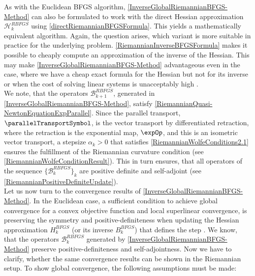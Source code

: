 As with the Euclidean BFGS algorithm, \cref{InverseGlobalRiemannianBFGS-Method} can also be formulated to work with the direct Hessian approximation $\mathcal{H}^{RBFGS}_k$ using \cref{directRiemannianBFGSFormula}. This yields a mathematically equivalent algorithm. Again, the question arises, which variant is more suitable in practice for the underlying problem. \cref{RiemannianInverseBFGSFormula} makes it possible to cheaply compute an approximation of the inverse of the Hessian. This may make \cref{InverseGlobalRiemannianBFGS-Method} advantageous even in the case, where we have a cheap exact formula for the Hessian but not for its inverse or when the cost of solving linear systems is unacceptably high \cite[p.~13]{Qi:2011}. \\
We note, that the operators $\mathcal{B}^{RBFGS}_{k+1}$, generated in \cref{InverseGlobalRiemannianBFGS-Method}, satisfy \cref{RiemannianQuasi-NewtonEquationExpParallel}. Since the parallel transport, $\parallelTransportSymbol$, is the vector transport by differentiated retraction, where the retraction is the exponential map, $\expOp$, and this is an isometric vector transport, a stepsize $\alpha_k > 0$ that satisfies \cref{RiemannianWolfeConditions2.1} ensures the fulfillment of the Riemannian curvature condition (see \cref{RiemannianWolfeConditionResult}). This in turn ensures, that all operators of the sequence $\{ \mathcal{B}^{RBFGS}_k \}_k$ are positive definite and self-adjoint (see \cref{RiemannianPositiveDefiniteUpdate}). \\
Let us now turn to the convergence results of \cref{InverseGlobalRiemannianBFGS-Method}. In the Euclidean case, a sufficient condition to achieve global convergence for a convex objective function and local superlinear convergence, is preserving the symmetry and positive-definiteness when updating the Hessian approximation $H^{BFGS}_k$ (or its inverse $B^{BFGS}_k$) that defines the step \cite[p.~20-21]{Qi:2011}. We know, that the operators $\mathcal{B}^{RBFGS}_{k}$ generated by \cref{InverseGlobalRiemannianBFGS-Method} preserve positive-definiteness and self-adjointness. Now we have to clarify, whether the same convergence results can be shown in the Riemannian setup. To show global convergence, the following assumptions must be made: 

